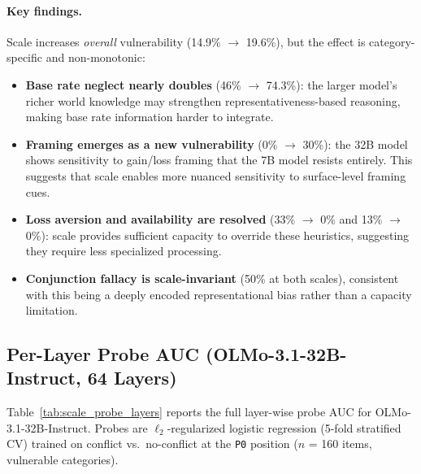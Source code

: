 \documentclass{article}
\newcommand{\pzero}{\texttt{P0}}
\begin{document}
\paragraph{Key findings.}
Scale increases \emph{overall} vulnerability (14.9\% $\to$ 19.6\%),
but the effect is category-specific and non-monotonic:
\begin{itemize}[leftmargin=*,itemsep=2pt]
  \item \textbf{Base rate neglect nearly doubles} (46\% $\to$ 74.3\%):
  the larger model's richer world knowledge may strengthen
  representativeness-based reasoning, making base rate information
  harder to integrate.
  \item \textbf{Framing emerges as a new vulnerability} (0\% $\to$ 30\%):
  the 32B model shows sensitivity to gain/loss framing that the 7B
  model resists entirely.  This suggests that scale enables more nuanced
  sensitivity to surface-level framing cues.
  \item \textbf{Loss aversion and availability are resolved} (33\% $\to$ 0\%
  and 13\% $\to$ 0\%): scale provides sufficient capacity to override
  these heuristics, suggesting they require less specialized processing.
  \item \textbf{Conjunction fallacy is scale-invariant} (50\% at both
  scales), consistent with this being a deeply encoded representational
  bias rather than a capacity limitation.
\end{itemize}

\subsection{Per-Layer Probe AUC (OLMo-3.1-32B-Instruct, 64 Layers)}

Table~\ref{tab:scale_probe_layers} reports the full layer-wise probe
AUC for OLMo-3.1-32B-Instruct.  Probes are $\ell_2$-regularized
logistic regression (5-fold stratified CV) trained on conflict vs.\
no-conflict at the \pzero{} position ($n$ = 160 items, vulnerable
categories).
\end{document}

